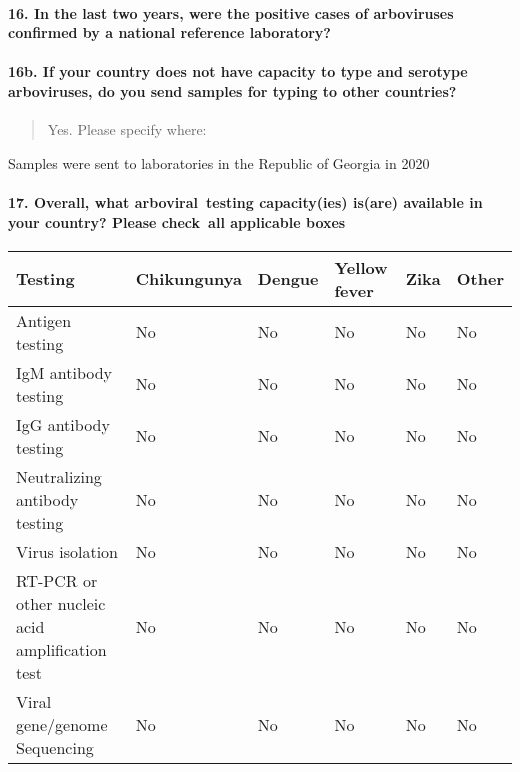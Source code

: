 \documentclass[
]{article}
\begin{document}
\hypertarget{in-the-last-two-years-were-the-positive-cases-of-arboviruses-confirmed-by-a-national-reference-laboratory}{%
\paragraph{16. In the last two years, were the positive cases of
arboviruses confirmed by a national reference
laboratory?}\label{in-the-last-two-years-were-the-positive-cases-of-arboviruses-confirmed-by-a-national-reference-laboratory}}

\begin{quote}
\end{quote}

\hypertarget{b.-if-your-country-does-not-have-capacity-to-type-and-serotype-arboviruses-do-you-send-samples-for-typing-to-other-countries}{%
\paragraph{16b. If your country does not have capacity to type and
serotype arboviruses, do you send samples for typing to other
countries?}\label{b.-if-your-country-does-not-have-capacity-to-type-and-serotype-arboviruses-do-you-send-samples-for-typing-to-other-countries}}

\begin{quote}
Yes. Please specify where:
\end{quote}

Samples were sent to laboratories in the Republic of Georgia in 2020

\hypertarget{overall-what-arboviral-testing-capacityies-isare-available-in-your-country-please-check-all-applicable-boxes}{%
\paragraph{17. Overall, what arboviral~testing capacity(ies) is(are)
available in your country? Please check~all applicable
boxes}\label{overall-what-arboviral-testing-capacityies-isare-available-in-your-country-please-check-all-applicable-boxes}}

\begin{longtable}[]{@{}llllll@{}}
\toprule
Testing & Chikungunya & Dengue & Yellow fever & Zika & Other \\
\midrule
\endhead
Antigen testing & No & No & No & No & No \\
IgM antibody testing & No & No & No & No & No \\
IgG antibody testing & No & No & No & No & No \\
Neutralizing antibody testing & No & No & No & No & No \\
Virus isolation & No & No & No & No & No \\
RT-PCR or other nucleic acid amplification test & No & No & No & No &
No \\
Viral gene/genome Sequencing & No & No & No & No & No \\
\bottomrule
\end{longtable}
\end{document}
